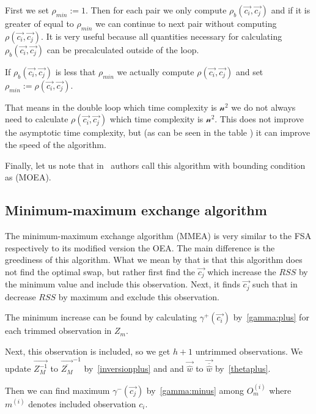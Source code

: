 First we set $\rho_{min} :=1$. Then for each pair we only compute $\rho_b(\vec{c_i}, \vec{c_j})$ and if it is greater of equal to $\rho_{min}$ we can continue to next pair without computing $\rho(\vec{c_i}, \vec{c_j})$. 
It is very useful because all quantities necessary for calculating $\rho_b(\vec{c_i}, \vec{c_j})$ can be precalculated outside of the loop.

If $\rho_b(\vec{c_i}, \vec{c_j})$ is less that  $\rho_{min}$ we actually compute $\rho(\vec{c_i}, \vec{c_j})$ and set $\rho_{min} := \rho(\vec{c_i}, \vec{c_j})$.

That means in the double loop which time complexity is $\mathcal{n^2}$  we do not always need to calculate $\rho(\vec{c_i}, \vec{c_j})$ which time complexity is $\mathcal{n^2}$. This does not improve the asymptotic time complexity, but (as can be seen in the table ) it can improve the speed of the algorithm. 

Finally, let us note that in~\cite{agullo2001new} authors call this algorithm with bounding condition as  (MOEA).




\subsection{Minimum-maximum exchange algorithm}
The minimum-maximum exchange algorithm (MMEA) is very similar to the FSA respectively to its modified version the OEA. The main difference is the greediness of this algorithm. What we mean by that is that this algorithm does not find the optimal swap, but rather first find the $\vec{c_j}$  which increase the $RSS$ by the minimum value and include this observation.
Next, it finds $\vec{c_j}$ such that in decrease $RSS$ by maximum and exclude this observation.

The minimum increase can be found by calculating $\gamma^{+}(\vec{c_i}) $ by~\eqref{gamma:plus} for each trimmed observation in  $Z_m$.

Next, this observation is included, so we get $h+1$ untrimmed observations. We update 
$\vec{Z_M^{-1}}$ to  $\vec{\overline{Z_M}}^{-1}$ by~\eqref{inversionplus} and  and $\vec{\hat{w}}$ to $\vec{\overline{\hat{w}}}$ by~\eqref{thetaplus}.

Then we can find maximum  $\gamma^{-}(\vec{c_j})$ by~\eqref{gamma:minus} among $O_m^{(i)}$ where $m^{(i)}$ denotes included observation $c_i$.

